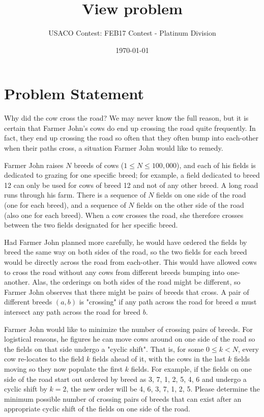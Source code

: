 \documentclass[12pt]{article}
\title{View problem}
\author{USACO Contest: FEB17 Contest - Platinum Division}
\date{\today}
\begin{document}
\maketitle

\section*{Problem Statement}

Why did the cow cross the road?  We may never know the full reason, but it is
certain that Farmer John's cows do end up crossing the road quite frequently. 
In fact, they end up crossing the road so often that they often bump into
each-other when their paths cross, a situation Farmer John would like to remedy.

Farmer John raises $N$ breeds of cows ($1 \leq N \leq 100,000$), and each of his
fields is dedicated to grazing for one specific breed; for example, a field
dedicated to breed 12 can only be used for cows of breed 12 and not of any other
breed. A long road runs through his farm.  There is a sequence of $N$ fields on
one side of the road (one for each breed), and a sequence of $N$ fields on the
other side of the road (also one for each breed). When a cow crosses the road,
she therefore crosses between the two fields designated for her specific breed.

Had Farmer John planned more carefully, he would have ordered the fields by
breed the same way on both sides of the road, so the two fields for each breed
would be directly across the road from each-other.  This would have  allowed
cows to cross the road without any cows from different breeds bumping into
one-another.  Alas, the orderings on both sides of the road might be different,
so Farmer John observes that there might be pairs of breeds that cross.  A pair
of different breeds $(a,b)$ is "crossing" if any path across the  road for breed
$a$ must intersect any path across the road for breed $b$.  

Farmer John would like to minimize the number of crossing pairs of breeds.  For
logistical reasons, he figures he can move cows around on one side of the road
so the fields on that side undergo a "cyclic shift". That is, for some
$0 \leq k < N$, every cow re-locates to the field $k$ fields ahead of it, with
the cows in the last $k$ fields moving so they now populate the first $k$
fields.  For example, if the fields on one side of the road start out ordered by
breed as 3, 7, 1, 2, 5, 4, 6 and undergo a cyclic shift by $k=2$, the new order
will be 4, 6, 3, 7, 1, 2, 5.  Please determine the minimum possible number of
crossing pairs of breeds that can exist after an appropriate cyclic shift of the
fields on one side of the road.
\end{document}
